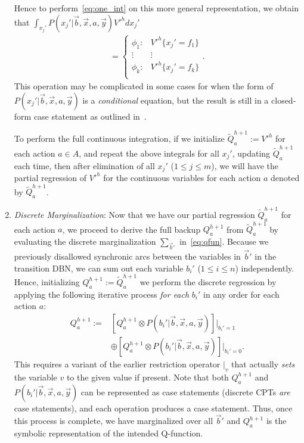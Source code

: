 \begin{enumerate}
Hence to perform~\eqref{eq:one_int} on this more general
representation, we obtain that $\int_{x_j'} P(x_j'|\vec{b},\vec{x},a,\vec{y}) V'^{h} dx_j'$
\begin{align*}
    = \begin{cases}
    \phi_1: & V'^{h} \{ x_j' = f_1 \} \\ 
   \vdots&\vdots\\ 
    \phi_k: & V'^{h} \{ x_j' = f_k \}  \\ 
  \end{cases}.
\end{align*}
This operation may be complicated in some cases for
when the form of 
$P(x_j'|\vec{b},\vec{x},a,\vec{y})$ is a \emph{conditional} 
equation, but the result is still in a closed-form case
statement as outlined in~\cite{sanner_uai11}.

To perform the full continuous integration, 
if we initialize 
$\tilde{Q}_a^{h+1} := V'^{h}$ for each action $a \in A$, and repeat
the above integrals for all $x_j'$, updating $\tilde{Q}_a^{h+1}$ each time,
then after elimination of all $x_j'$ ($1 \leq j \leq m$), we will have 
the partial regression of $V'^{h}$ for the continuous variables for
each action $a$ denoted by $\tilde{Q}_a^{h+1}$.

\item {\it Discrete Marginalization}: Now that we have our partial
regression $\tilde{Q}_a^{h+1}$ for each action $a$, we proceed
to derive the full backup $Q_a^{h+1}$ from $\tilde{Q}_a^{h+1}$
by evaluating the discrete 
marginalization $\sum_{\vec{b}'}$ in~\eqref{eq:qfun}.
Because we previously disallowed synchronic arcs
between the variables in $\vec{b}'$ 
in the transition DBN, we can sum out each variable $b_i'$ ($1 \leq i \leq n$) 
independently.  Hence, initializing
$Q_a^{h+1} := \tilde{Q}_a^{h+1}$
we perform the discrete regression by applying the following iterative
process \emph{for each} $b_i'$ in any order
for each action $a$:
\begin{align}
Q_a^{h+1} := & \left[ Q_a^{h+1} \otimes P(b_i'|\vec{b},\vec{x},a,\vec{y}) \right]|_{b_i' = 1} \nonumber \\
 & \oplus \left[ Q_a^{h+1} \otimes P(b_i'|\vec{b},\vec{x},a,\vec{y}) \right]|_{b_i' = 0}.
\end{align}
This requires a variant of the earlier restriction operator $|_v$ that
actually \emph{sets} the variable $v$ to the given value if present.
Note that both $Q_a^{h+1}$ and $P(b_i'|\vec{b},\vec{x},a,\vec{y})$ can be represented
as case statements (discrete CPTs \emph{are} case statements), 
and each operation produces a case statement.
Thus, once this process is complete, we have marginalized over
all $\vec{b}'$ and $Q_a^{h+1}$ is the symbolic representation
of the intended Q-function.


\end{enumerate}
